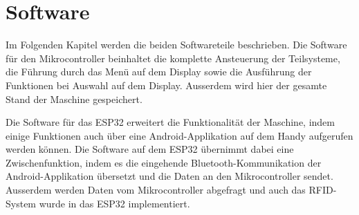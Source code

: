 \newpage
\section{Software}
\label{sec:Software}

Im Folgenden Kapitel werden die beiden Softwareteile beschrieben. Die Software für den Mikrocontroller beinhaltet die komplette Ansteuerung der Teilsysteme, die Führung durch das Menü auf dem Display sowie die Ausführung der Funktionen bei Auswahl auf dem Display. Ausserdem wird hier der gesamte Stand der Maschine gespeichert.

Die Software für das ESP32 erweitert die Funktionalität der Maschine, indem einige Funktionen auch über eine Android-Applikation auf dem Handy aufgerufen werden können. Die Software auf dem ESP32 übernimmt dabei eine Zwischenfunktion, indem es die eingehende Bluetooth-Kommunikation der Android-Applikation übersetzt und die Daten an den Mikrocontroller sendet. Ausserdem werden Daten vom Mikrocontroller abgefragt und auch das RFID-System wurde in das ESP32 implementiert.